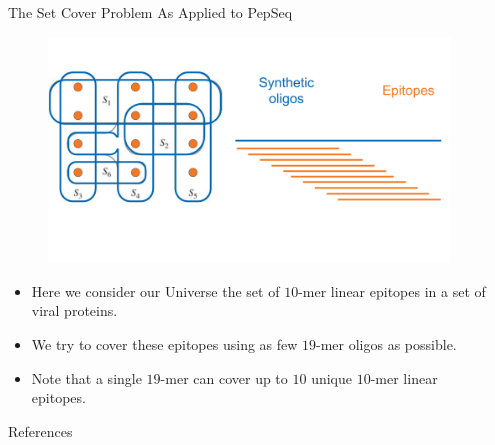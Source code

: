 \documentclass[final]{beamer}
\newlength{\sepwidth}
\newlength{\colwidth}
\newcommand{\separatorcolumn}{\begin{column}{\sepwidth}\end{column}}
\begin{document}
\begin{frame}[t]
\begin{columns}[t]
\begin{column}{\colwidth}
\begin{block}{The Set Cover Problem As Applied to PepSeq}
    \begin{figure}
      \includegraphics[width=0.7\colwidth]{figures/set_cover_oligo.png}
      \label{fig:library}
    \end{figure}
    \begin{itemize}
      \item Here we consider our Universe the set of $10$-mer linear epitopes in a set of viral proteins.
      \item We try to cover these epitopes using as few $19$-mer oligos as possible.
      \item Note that a single $19$-mer can cover up to $10$ unique $10$-mer linear epitopes.
    \end{itemize}


\end{block}
  \begin{block}{References}

    \nocite{*}
    \footnotesize{}

  \end{block}

\end{column}

\separatorcolumn



\end{columns}
\end{frame}
\end{document}
